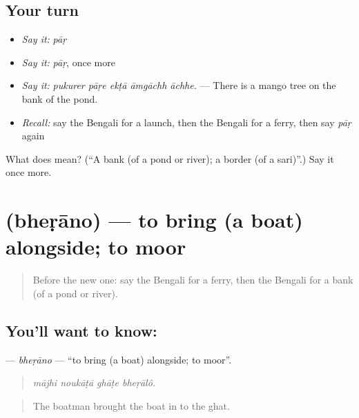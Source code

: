 \subsection*{Your turn}
\begin{itemize}
\raggedright
  \item \emph{Say it:} \emph{pāṛ}
  \item \emph{Say it:} \emph{pāṛ}, once more
  \item \emph{Say it:} \emph{pukurer pāṛe ekṭā āmgāchh āchhe.} — There is a mango tree on the bank of the pond.
  \item \emph{Recall:} say the Bengali for a launch, then the Bengali for a ferry, then say \emph{pāṛ} again
\end{itemize}

\begin{tcolorbox}[breakable,colback=teal!4,colframe=teal!35!black,title={Before you move on}]
What does  mean? (\textquotedblleft{}A bank (of a pond or river); a border (of a sari)\textquotedblright{}.) Say it once more.
\end{tcolorbox}
\section[\texorpdfstring{\bn{ভেড়ানো} (bheṛāno)}{ভেড়ানো (bheṛāno)}]{ (bheṛāno) — to bring (a boat) alongside; to moor}

\label{lesson:BN-C397-bherano}



\begin{quote}
Before the new one: say the Bengali for a ferry, then the Bengali for a bank (of a pond or river).
\end{quote}

\subsection*{You'll want to know: }
\textbf{} — \emph{bheṛāno} — \textquotedblleft{}to bring (a boat) alongside; to moor\textquotedblright{}.

\begin{quote}
   
\end{quote}

\begin{quote}
\emph{mājhi noukāṭā ghāṭe bheṛālô.}
\end{quote}

\begin{quote}
The boatman brought the boat in to the ghat.
\end{quote}

